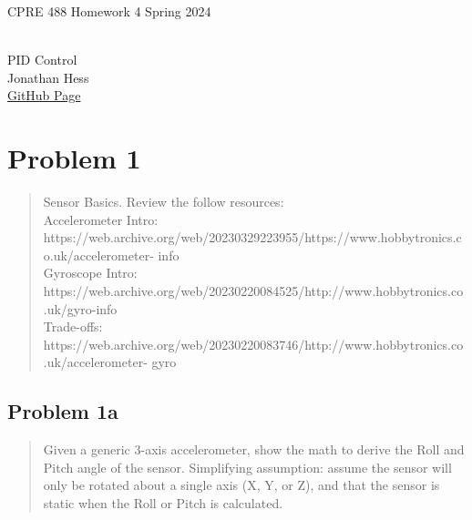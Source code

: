 \documentclass[10pt,a4paper]{article}
\author{}
\date{}
\let\oldsubsection\subsection
\renewcommand{\subsection}{%
    \setcounter{equation}{0}%
    \oldsubsection%
}
\begin{document}
\begin{flushleft}
\begin{LARGE}CPRE 488 Homework 4 Spring 2024
\end{LARGE}
\\PID Control
\\Jonathan Hess
\\\href{https://github.com/Jetsama/CPRE488/tree/main/HW4}{GitHub Page}
\end{flushleft}

\section{Problem 1}
\begin{quote}
Sensor Basics. Review the follow resources:\\

Accelerometer Intro:\\
https://web.archive.org/web/20230329223955/https://www.hobbytronics.co.uk/accelerometer-
info\\

Gyroscope Intro:\\
https://web.archive.org/web/20230220084525/http://www.hobbytronics.co.uk/gyro-info\\

Trade-offs:\\
https://web.archive.org/web/20230220083746/http://www.hobbytronics.co.uk/accelerometer-
gyro
\end{quote}


\subsection{Problem 1a}\begin{quote}
Given a generic 3-axis accelerometer, show the math to derive the Roll and Pitch angle of the sensor.
Simplifying assumption: assume the sensor will only be rotated about a single axis (X, Y, or Z), and that
the sensor is static when the Roll or Pitch is calculated.
\end{quote}
\end{document}
